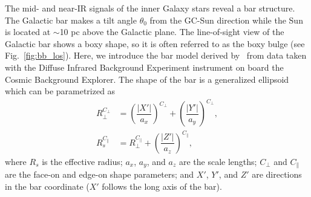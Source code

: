 \documentclass[doublespace,nopageskip]{VTthesis}
\begin{document}
The mid- and near-IR signals of the inner Galaxy stars reveal a bar structure. The Galactic bar makes a tilt angle $\theta_0$ from the GC-Sun direction while the Sun is located at $\sim$10 pc above the Galactic plane. The line-of-sight view of the Galactic bar shows a boxy shape, so it is often referred to as the boxy bulge (see Fig.~\ref{fig:bb_los}). Here, we introduce the bar model derived by~\citet{1998ApJ...492..495F} from data taken with the Diffuse Infrared Background Experiment instrument on board the Cosmic Background Explorer. The shape of the bar is a generalized ellipsoid which can be parametrized as
\begin{align}\label{eq:Rs}
  R_{\perp}^{C_{\perp}} &= \left(\dfrac{|X'|}{a_x}\right)^{C_{\perp}} + \left(\dfrac{|Y'|}{a_y}\right)^{C_{\perp}},\\
  R_s^{C_{\parallel}} &= R_{\perp}^{C_{\parallel}} + \left(\dfrac{|Z'|}{a_z}\right)^{C_{\parallel}},
\end{align}
where $R_s$ is the effective radius; $a_x$, $a_y$, and $a_z$ are the scale lengths; $C_\perp$ and $C_\parallel$ are the face-on and edge-on shape parameters; and $X'$, $Y'$, and $Z'$
are directions in the bar
coordinate ($X'$ follows the long axis of the bar). 
\end{document}
